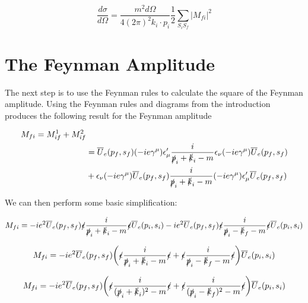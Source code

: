 \documentclass[a4]{article}
\begin{document}
    \begin{equation}
        \frac{d \sigma}{d \Omega} = \frac{m^2 d \Omega}{4 (2 \pi)^2 k_i \cdot p_i} \frac{1}{2} \sum_{S_i S_f} |M_{fi}|^2
    \end{equation}

    \section*{The Feynman Amplitude}

    The next step is to use the Feynman rules to calculate the square of the Feynman amplitude. Using the Feynman rules and diagrams from the introduction produces the following result for the Feynman amplitude

    \begin{equation}
        \begin{aligned}
            M_{fi} = M_{if}^1 + M_{if}^2 & \\
            & = \overline{U}_e (p_f, s_f) (- i e \gamma^{\mu}) \epsilon_{\mu}' \frac{i}{\slashed{p}_i + \slashed{k}_i - m} \epsilon_{\nu} (- i e \gamma^{\mu}) \overline{U}_e (p_f, s_f) \\
            & + \epsilon_{\nu} (- i e \gamma^{\mu}) \overline{U}_e (p_f, s_f) \frac{i}{\slashed{p}_i + \slashed{k}_i - m} (- i e \gamma^{\mu}) \epsilon_{\mu}' \overline{U}_e (p_f, s_f)
        \end{aligned}
    \end{equation}

    We can then perform some basic simplification:

    \begin{equation}
        M_{fi} = - i e^2 \overline{U}_e (p_f, s_f) \slashed{\epsilon} \frac{i}{\slashed{p}_i + \slashed{k}_i - m} \slashed{\epsilon} \overline{U}_e (p_i, s_i)
        - i e^2 \overline{U}_e (p_f, s_f) \slashed{\epsilon} \frac{i}{\slashed{p}_i - \slashed{k}_f - m} \slashed{\epsilon} \overline{U}_e (p_i, s_i)
    \end{equation}

    \begin{equation}
        M_{fi} = - i e^2 \overline{U}_e (p_f, s_f) \bigg( \slashed{\epsilon} \frac{i}{\slashed{p}_i + \slashed{k}_i - m} \slashed{\epsilon} + \slashed{\epsilon} \frac{i}{\slashed{p}_i - \slashed{k}_f - m} \slashed{\epsilon} \bigg) \overline{U}_e (p_i, s_i)
    \end{equation}

    \begin{equation}
        M_{fi} = - i e^2 \overline{U}_e (p_f, s_f) \bigg( \slashed{\epsilon} \frac{i}{(\slashed{p}_i + \slashed{k}_i)^2 - m} \slashed{\epsilon} + \slashed{\epsilon} \frac{i}{(\slashed{p}_i - \slashed{k}_f)^2 - m} \slashed{\epsilon} \bigg) \overline{U}_e (p_i, s_i)
    \end{equation}
\end{document}

